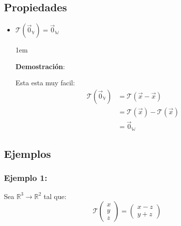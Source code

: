 \documentclass[12pt, fleqn]{report}                             %
\newenvironment{SmallIndentation}[1][0.75em]                    %
        {\begin{adjustwidth}{#1}{}\begin{footnotesize}}             %
        {\end{footnotesize}\end{adjustwidth}}                       %
\theoremstyle{break}                                            %
\DeclareMathOperator \VectorSet    {\mathbb{V}}                 %
\DeclareMathOperator \SubVectorSet {\mathbb{W}}                 %
\DeclareMathOperator \LinTrans {\mathcal{T}}                    %
\newcommand{\Wrap}[1]    {\left( #1 \right)}                    %
\newcommand{\FnLinTrans}[1]{\mathcal{T}\Wrap{#1}}               %
\newcommand{\VecLinTrans}[1]{\mathcal{T}\pVector{#1}}           %
\newcommand{\pVector}[1]                                        %
        { \ensuremath{\begin{pmatrix}#1\end{pmatrix}} }             %
\begin{document}
            \vspace{1em}
            \subsection{Propiedades}

                \begin{itemize}
                    \item $\FnLinTrans{\vec 0_{\VectorSet}} = \vec 0_{\SubVectorSet}$

                    \begin{SmallIndentation}[1em]
                        \textbf{Demostración}:
                        
                        Esta esta muy facil:
                        \begin{align*}
                            \FnLinTrans{\vec 0_{\VectorSet}}
                                &= \FnLinTrans{\vec x - \vec x}                     \\
                                &= \FnLinTrans{\vec x} - \FnLinTrans{\vec x}        \\
                                &= \vec 0_{\SubVectorSet}
                        \end{align*}
                    
                    \end{SmallIndentation}
                        
                \end{itemize}



            \clearpage
            \subsection{Ejemplos}

                \subsubsection{Ejemplo 1:}
                    Sea $\mathbb{R}^3 \to \mathbb{R}^2$ tal que:
                    \begin{equation*}
                        \VecLinTrans{x\\y\\z}  = \pVector{x-z\\y+z}
                    \end{equation*}
\end{document}
